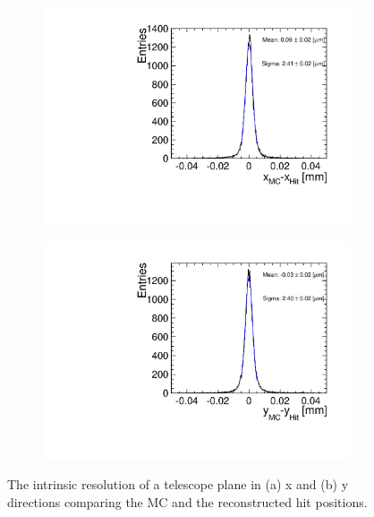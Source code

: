 \begin{figure}[htbp] \centering
  \begin{subfigure}[b]{0.45\textwidth}
    \includegraphics[width=\textwidth]{figures/Telescope/telescopePlane0_MC_vs_hit_x.pdf}
    \caption{}
  \end{subfigure}\hfill
  \begin{subfigure}[b]{0.45\textwidth}
    \includegraphics[width=\textwidth]{figures/Telescope/telescopePlane0_MC_vs_hit_y.pdf}
    \caption{}
  \end{subfigure}
  \caption{The intrinsic resolution of a telescope plane in (a) x and
    (b) y directions comparing the MC and the reconstructed
    hit positions.}
  \label{fig:TelPlane0_MC_hit}
\end{figure}

